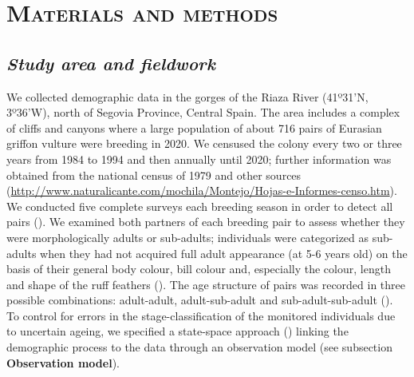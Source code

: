 \documentclass[12pt]{article}
\begin{document}
\section*{\textsc{Materials and methods}}

\subsection*{\textit{Study area and fieldwork}}
We collected demographic data in the gorges of the Riaza River (41º31'N, 3º36'W), north of Segovia Province, Central Spain. The area includes a complex of cliffs and canyons where a large population of about 716 pairs of Eurasian griffon vulture were breeding in 2020. We censused the colony every two or three years from 1984 to 1994 and then annually until 2020; further information was obtained from the national census of 1979 and other sources (\url{http://www.naturalicante.com/mochila/Montejo/Hojas-e-Informes-censo.htm}). We conducted five complete surveys each breeding season in order to detect all pairs (\cite{Martinez1997}). We examined both partners of each breeding pair to assess whether they were morphologically adults or sub-adults; individuals were categorized as sub-adults when they had not acquired full adult appearance (at 5-6 years old) on the basis of their general body colour, bill colour and, especially the colour, length and shape of the ruff feathers (\cite{Elosegui1989,Blanco1996,Duriez2011}). The age structure of pairs was recorded in three possible combinations: adult-adult, adult-sub-adult and sub-adult-sub-adult (\cite{Blanco1996,Blanco1997}). To control for errors in the stage-classification of the monitored individuals due to uncertain ageing, we specified a state-space approach (\cite{King2010}) linking the demographic process to the data through an observation model (see subsection \textbf{Observation model}).\\
\end{document}
